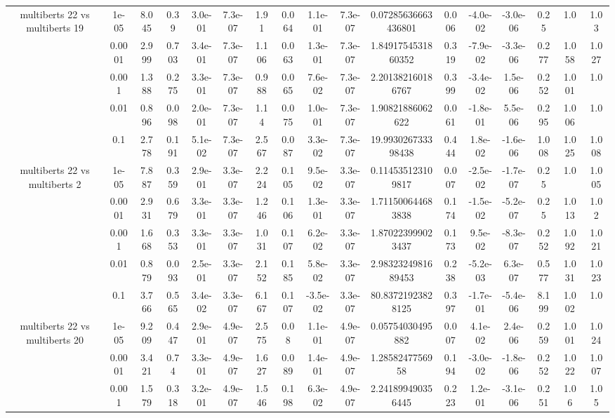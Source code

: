 \begin{tabular}{|c|c|c|c|c|c|c|c|c|c|c|c|c|c|c|c|c|}
\hline
\multirow{5}{*}{multiberts 22 vs multiberts 19} & 1e-05 & 8.045 & 0.39 & 3.0e-01 & 7.3e-07 & 1.91 & 0.064 & 1.1e-01 & 7.3e-07 & 0.07285636663436801 & 0.006 & -4.0e-02 & -3.0e-06 & 0.25 & 1.0 & 1.03 \\
 & 0.0001 & 2.999 & 0.703 & 3.4e-01 & 7.3e-07 & 1.106 & 0.063 & 1.3e-01 & 7.3e-07 & 1.8491754531860352 & 0.319 & -7.9e-02 & -3.3e-06 & 0.277 & 1.058 & 1.027 \\
 & 0.001 & 1.388 & 0.275 & 3.3e-01 & 7.3e-07 & 0.988 & 0.065 & 7.6e-02 & 7.3e-07 & 2.201382160186767 & 0.399 & -3.4e-02 & 1.5e-06 & 0.252 & 1.001 & 1.0 \\
 & 0.01 & 0.896 & 0.098 & 2.0e-01 & 7.3e-07 & 1.14 & 0.075 & 1.0e-01 & 7.3e-07 & 1.90821886062622 & 0.061 & -1.8e-01 & 5.5e-06 & 0.295 & 1.006 & 1.0 \\
 & 0.1 & 2.778 & 0.191 & 5.1e-02 & 7.3e-07 & 2.567 & 0.087 & 3.3e-02 & 7.3e-07 & 19.993026733398438 & 0.444 & 1.8e-02 & -1.6e-06 & 1.008 & 1.025 & 1.008 \\
\hline
\multirow{5}{*}{multiberts 22 vs multiberts 2} & 1e-05 & 7.887 & 0.359 & 2.9e-01 & 3.3e-07 & 2.224 & 0.105 & 9.5e-02 & 3.3e-07 & 0.114535123109817 & 0.007 & -2.5e-02 & -1.7e-07 & 0.25 & 1.0 & 1.005 \\
 & 0.0001 & 2.931 & 0.679 & 3.3e-01 & 3.3e-07 & 1.246 & 0.106 & 1.3e-01 & 3.3e-07 & 1.711500644683838 & 0.174 & -1.5e-02 & -5.2e-07 & 0.25 & 1.013 & 1.02 \\
 & 0.001 & 1.668 & 0.353 & 3.3e-01 & 3.3e-07 & 1.031 & 0.107 & 6.2e-02 & 3.3e-07 & 1.870223999023437 & 0.173 & 9.5e-02 & -8.3e-07 & 0.252 & 1.092 & 1.021 \\
 & 0.01 & 0.879 & 0.093 & 2.5e-01 & 3.3e-07 & 2.152 & 0.185 & 5.8e-02 & 3.3e-07 & 2.9832324981689453 & 0.238 & -5.2e-03 & 6.3e-07 & 0.577 & 1.031 & 1.023 \\
 & 0.1 & 3.766 & 0.565 & 3.4e-02 & 3.3e-07 & 6.167 & 0.107 & -3.5e-02 & 3.3e-07 & 80.83721923828125 & 0.397 & -1.7e-01 & -5.4e-06 & 8.199 & 1.002 & 1.0 \\
\hline
\multirow{5}{*}{multiberts 22 vs multiberts 20} & 1e-05 & 9.209 & 0.447 & 2.9e-01 & 4.9e-07 & 2.575 & 0.08 & 1.1e-01 & 4.9e-07 & 0.05754030495882 & 0.007 & 4.1e-02 & 2.4e-06 & 0.259 & 1.001 & 1.024 \\
 & 0.0001 & 3.421 & 0.74 & 3.3e-01 & 4.9e-07 & 1.627 & 0.089 & 1.4e-01 & 4.9e-07 & 1.2858247756958 & 0.194 & -3.0e-02 & -1.8e-06 & 0.252 & 1.022 & 1.007 \\
 & 0.001 & 1.579 & 0.318 & 3.2e-01 & 4.9e-07 & 1.546 & 0.198 & 6.3e-02 & 4.9e-07 & 2.241899490356445 & 0.223 & 1.2e-01 & -3.1e-06 & 0.251 & 1.06 & 1.05 \\

\end{tabular}
